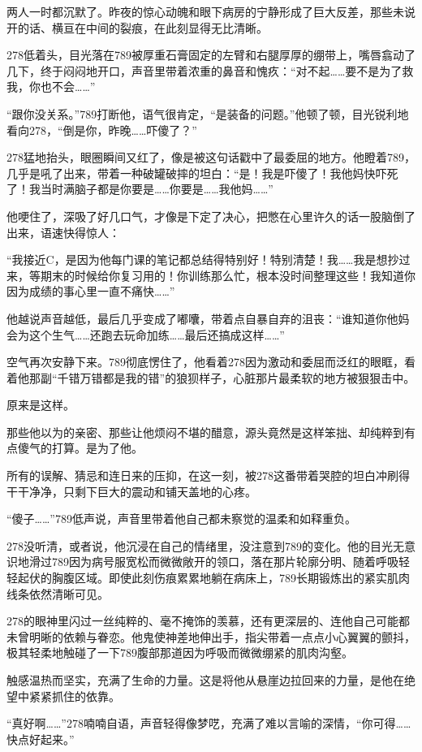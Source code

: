 \documentclass[a4paper]{book}
\begin{document}
两人一时都沉默了。昨夜的惊心动魄和眼下病房的宁静形成了巨大反差，那些未说开的话、横亘在中间的裂痕，在此刻显得无比清晰。

278低着头，目光落在789被厚重石膏固定的左臂和右腿厚厚的绷带上，嘴唇翕动了几下，终于闷闷地开口，声音里带着浓重的鼻音和愧疚：“对不起……要不是为了救我，你也不会……”

“跟你没关系。”789打断他，语气很肯定，“是装备的问题。”他顿了顿，目光锐利地看向278，“倒是你，昨晚……吓傻了？”

278猛地抬头，眼圈瞬间又红了，像是被这句话戳中了最委屈的地方。他瞪着789，几乎是吼了出来，带着一种破罐破摔的坦白：“是！我是吓傻了！我他妈快吓死了！我当时满脑子都是你要是……你要是……我他妈……”

他哽住了，深吸了好几口气，才像是下定了决心，把憋在心里许久的话一股脑倒了出来，语速快得惊人：

“我接近C，是因为他每门课的笔记都总结得特别好！特别清楚！我……我是想抄过来，等期末的时候给你复习用的！你训练那么忙，根本没时间整理这些！我知道你因为成绩的事心里一直不痛快……”

他越说声音越低，最后几乎变成了嘟囔，带着点自暴自弃的沮丧：“谁知道你他妈会为这个生气……还跑去玩命加练……最后还搞成这样……”

空气再次安静下来。789彻底愣住了，他看着278因为激动和委屈而泛红的眼眶，看着他那副“千错万错都是我的错”的狼狈样子，心脏那片最柔软的地方被狠狠击中。

原来是这样。

那些他以为的亲密、那些让他烦闷不堪的醋意，源头竟然是这样笨拙、却纯粹到有点傻气的打算。是为了他。

所有的误解、猜忌和连日来的压抑，在这一刻，被278这番带着哭腔的坦白冲刷得干干净净，只剩下巨大的震动和铺天盖地的心疼。

“傻子……”789低声说，声音里带着他自己都未察觉的温柔和如释重负。

278没听清，或者说，他沉浸在自己的情绪里，没注意到789的变化。他的目光无意识地滑过789因为病号服宽松而微微敞开的领口，落在那片轮廓分明、随着呼吸轻轻起伏的胸腹区域。即使此刻伤痕累累地躺在病床上，789长期锻炼出的紧实肌肉线条依然清晰可见。

278的眼神里闪过一丝纯粹的、毫不掩饰的羡慕，还有更深层的、连他自己可能都未曾明晰的依赖与眷恋。他鬼使神差地伸出手，指尖带着一点点小心翼翼的颤抖，极其轻柔地触碰了一下789腹部那道因为呼吸而微微绷紧的肌肉沟壑。

触感温热而坚实，充满了生命的力量。这是将他从悬崖边拉回来的力量，是他在绝望中紧紧抓住的依靠。

“真好啊……”278喃喃自语，声音轻得像梦呓，充满了难以言喻的深情，“你可得……快点好起来。”
\end{document}
